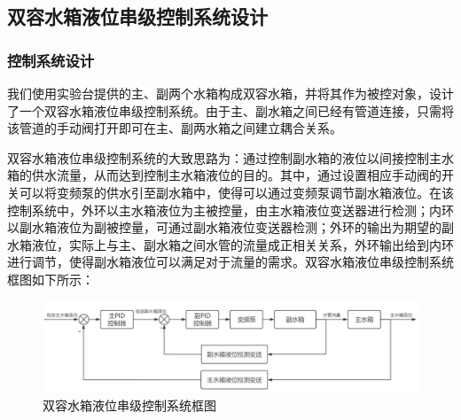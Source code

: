 \documentclass[UTF8]{article}
\begin{document}
\subsection{双容水箱液位串级控制系统设计}
\subsubsection{控制系统设计}
我们使用实验台提供的主、副两个水箱构成双容水箱，并将其作为被控对象，设计了一个双容水箱液位串级控制系统。由于主、副水箱之间已经有管道连接，只需将该管道的手动阀打开即可在主、副两水箱之间建立耦合关系。

双容水箱液位串级控制系统的大致思路为：通过控制副水箱的液位以间接控制主水箱的供水流量，从而达到控制主水箱液位的目的。其中，通过设置相应手动阀的开关可以将变频泵的供水引至副水箱中，使得可以通过变频泵调节副水箱液位。在该控制系统中，外环以主水箱液位为主被控量，由主水箱液位变送器进行检测；内环以副水箱液位为副被控量，可通过副水箱液位变送器检测；外环的输出为期望的副水箱液位，实际上与主、副水箱之间水管的流量成正相关关系，外环输出给到内环进行调节，使得副水箱液位可以满足对于流量的需求。双容水箱液位串级控制系统框图如下所示：
\begin{figure}[H]
    \centering %
    \includegraphics[width=1\textwidth]{figure/双容水箱控制系统框图.png} 
    \caption{双容水箱液位串级控制系统框图} %
\end{figure}

\end{document}
